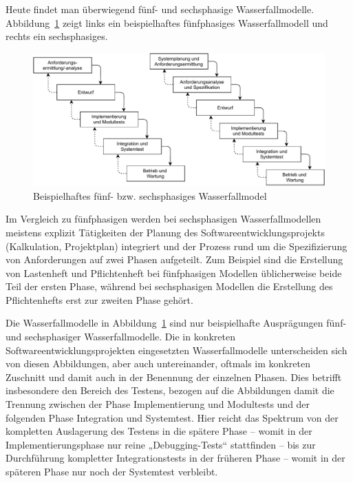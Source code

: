 
Heute findet man überwiegend fünf- und sechsphasige Wasserfallmodelle. Abbildung~\ref{fig:wasserfallmodel_fuenf_phasen} zeigt links ein beispielhaftes fünfphasiges Wasserfallmodell und rechts ein sechsphasiges. 

\begin{figure}[h!]
    \centering
		\includegraphics[width=1.0\textwidth]{Bilder/Kapitel-2/Abb-2-6.pdf}%
    \caption{Beispielhaftes fünf- bzw. sechsphasiges Wasserfallmodel}
    \label{fig:wasserfallmodel_fuenf_phasen}
\end{figure}

Im Vergleich zu fünfphasigen werden bei sechsphasigen Wasserfallmodellen meistens explizit Tätigkeiten der Planung des Softwareentwicklungsprojekts (\zb Kalkulation, Projektplan) integriert und der Prozess rund um die Spezifizierung von Anforderungen auf zwei Phasen aufgeteilt. Zum Beispiel sind die Erstellung von Lastenheft 
und Pflichtenheft bei fünfphasigen Modellen üblicherweise beide Teil der ersten Phase, während bei sechsphasigen Modellen die Erstellung des Pflichtenhefts erst zur zweiten Phase gehört. 

Die Wasserfallmodelle in Abbildung~\ref{fig:wasserfallmodel_fuenf_phasen} sind nur beispielhafte Ausprägungen fünf- und sechsphasiger Wasserfallmodelle. Die in konkreten Softwareentwicklungsprojekten eingesetzten Wasserfallmodelle unterscheiden sich von diesen Abbildungen, aber auch untereinander, oftmals im konkreten Zuschnitt und damit auch in der Benennung der einzelnen Phasen. Dies betrifft insbesondere den Bereich des Testens, bezogen auf die Abbildungen damit die Trennung zwischen der Phase Implementierung und Modultests %
und der folgenden Phase Integration und Systemtest. Hier reicht das Spektrum von der kompletten Auslagerung des Testens in die spätere Phase – womit in der Implementierungsphase nur reine „Debugging-Tests“ stattfinden – bis zur Durchführung kompletter Integrationstests in der früheren Phase – womit in der späteren Phase nur noch der Systemtest verbleibt. 

